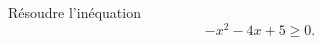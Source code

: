 
\begin{exercice}\label{exoPremiere-0084}

    Résoudre l'inéquation 
    \begin{equation}
        -x^2-4x+5\geq 0.
    \end{equation}

\end{exercice}
